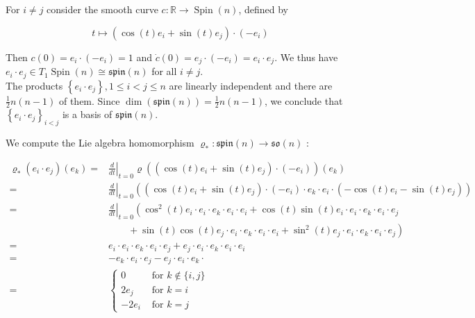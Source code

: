 \documentclass[10pt, letterpaper]{article}
\begin{document}
For $i \neq j$ consider the smooth curve $c: \mathbb{R} \rightarrow \operatorname{Spin}(n)$, defined by

$$
t \mapsto\left(\cos (t) e_{i}+\sin (t) e_{j}\right) \cdot\left(-e_{i}\right)
$$

Then $c(0)=e_{i} \cdot\left(-e_{i}\right)=1$ and $\dot{c}(0)=e_{j} \cdot\left(-e_{i}\right)=e_{i} \cdot e_{j}$. We thus have $e_{i} \cdot e_{j} \in T_{1} \operatorname{Spin}(n) \cong \mathfrak{s p i n}(n)$ for all $i \neq j$.\\
The products $\left\{e_{i} \cdot e_{j}\right\}, 1 \leq i<j \leq n$ are linearly independent and there are $\frac{1}{2} n(n-1)$ of them. Since $\operatorname{dim}(\mathfrak{s p i n}(n))=\frac{1}{2} n(n-1)$, we conclude that $\left\{e_{i} \cdot e_{j}\right\}_{i<j}$ is a basis of $\mathfrak{s p i n}(n)$.

We compute the Lie algebra homomorphism $\varrho_{*}: \mathfrak{s p i n}(n) \rightarrow \mathfrak{s o}(n)$ :

$$
\begin{aligned}
\varrho_{*}\left(e_{i} \cdot e_{j}\right)\left(e_{k}\right)= & \left.\frac{d}{d t}\right|_{t=0} \varrho\left(\left(\cos (t) e_{i}+\sin (t) e_{j}\right) \cdot\left(-e_{i}\right)\right)\left(e_{k}\right) \\
= & \left.\frac{d}{d t}\right|_{t=0}\left(\left(\cos (t) e_{i}+\sin (t) e_{j}\right) \cdot\left(-e_{i}\right) \cdot e_{k} \cdot e_{i} \cdot\left(-\cos (t) e_{i}-\sin (t) e_{j}\right)\right) \\
= & \left.\frac{d}{d t}\right|_{t=0}\left(\cos ^{2}(t) e_{i} \cdot e_{i} \cdot e_{k} \cdot e_{i} \cdot e_{i}+\cos (t) \sin (t) e_{i} \cdot e_{i} \cdot e_{k} \cdot e_{i} \cdot e_{j}\right. \\
& \left.\quad \quad+\sin (t) \cos (t) e_{j} \cdot e_{i} \cdot e_{k} \cdot e_{i} \cdot e_{i}+\sin ^{2}(t) e_{j} \cdot e_{i} \cdot e_{k} \cdot e_{i} \cdot e_{j}\right) \\
= & e_{i} \cdot e_{i} \cdot e_{k} \cdot e_{i} \cdot e_{j}+e_{j} \cdot e_{i} \cdot e_{k} \cdot e_{i} \cdot e_{i} \\
= & -e_{k} \cdot e_{i} \cdot e_{j}-e_{j} \cdot e_{i} \cdot e_{k} \cdot \\
= & \begin{cases}0 & \text { for } k \notin\{i, j\} \\
2 e_{j} & \text { for } k=i \\
-2 e_{i} & \text { for } k=j\end{cases}
\end{aligned}
$$
\end{document}
